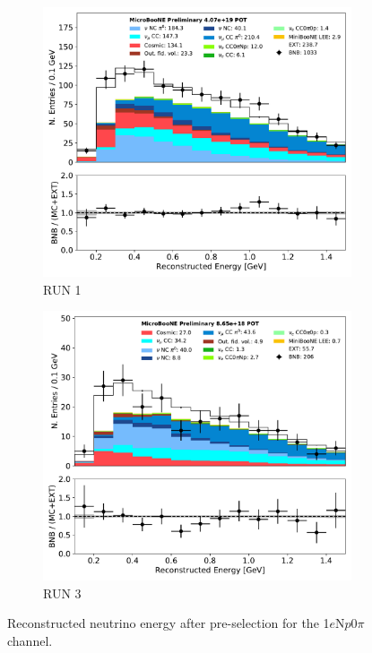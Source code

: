 \documentclass[a4paper]{article}
\newcommand{\npsel}{1$e$N$p$0$\pi$ }
\begin{document}
\begin{figure}[ht] 
\begin{center}
    \begin{subfigure}[b]{0.45\textwidth}
    \centering
    \includegraphics[width=1.00\textwidth]{1eNp/reco_e_01162020_RUN1.pdf}
    \caption{\label{fig:1eNp:prsel:RUN1} RUN 1}
    \end{subfigure}
    \begin{subfigure}[b]{0.45\textwidth}
    \centering
    \includegraphics[width=1.00\textwidth]{1eNp/reco_e_01162020_RUN3.pdf}
    \caption{\label{fig:1eNp:prsel:RUN1} RUN 3}
    \end{subfigure}
\caption{\label{fig:1eNp:prsel}Reconstructed neutrino energy after pre-selection for the \npsel channel.}
\end{center}
\end{figure}
\end{document}
